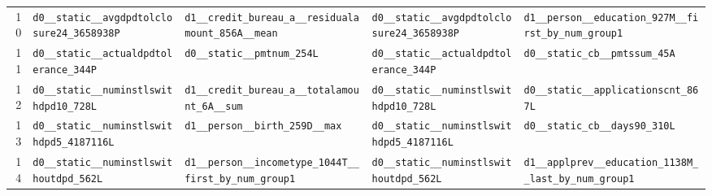 \documentclass[final,5p,twocolumn]{elsarticle}
\begin{document}
\begin{table}[htbp]
\begin{threeparttable}
\begin{tabular}{@{}rL{40mm}L{40mm}L{40mm}L{40mm}@{}}
10 & \texttt{d0\_\allowbreak \_\allowbreak static\_\allowbreak \_\allowbreak avgdpdtolclosure24\_\allowbreak 3658938P} & \texttt{d1\_\allowbreak \_\allowbreak credit\_\allowbreak bureau\_\allowbreak a\_\allowbreak \_\allowbreak residualamount\_\allowbreak 856A\_\allowbreak \_\allowbreak mean} & \texttt{d0\_\allowbreak \_\allowbreak static\_\allowbreak \_\allowbreak avgdpdtolclosure24\_\allowbreak 3658938P} & \texttt{d1\_\allowbreak \_\allowbreak person\_\allowbreak \_\allowbreak education\_\allowbreak 927M\_\allowbreak \_\allowbreak first\_\allowbreak by\_\allowbreak num\_\allowbreak group1} \\
11 & \texttt{d0\_\allowbreak \_\allowbreak static\_\allowbreak \_\allowbreak actualdpdtolerance\_\allowbreak 344P} & \texttt{d0\_\allowbreak \_\allowbreak static\_\allowbreak \_\allowbreak pmtnum\_\allowbreak 254L} & \texttt{d0\_\allowbreak \_\allowbreak static\_\allowbreak \_\allowbreak actualdpdtolerance\_\allowbreak 344P} & \texttt{d0\_\allowbreak \_\allowbreak static\_\allowbreak cb\_\allowbreak \_\allowbreak pmtssum\_\allowbreak 45A} \\
12 & \texttt{d0\_\allowbreak \_\allowbreak static\_\allowbreak \_\allowbreak numinstlswithdpd10\_\allowbreak 728L} & \texttt{d1\_\allowbreak \_\allowbreak credit\_\allowbreak bureau\_\allowbreak a\_\allowbreak \_\allowbreak totalamount\_\allowbreak 6A\_\allowbreak \_\allowbreak sum} & \texttt{d0\_\allowbreak \_\allowbreak static\_\allowbreak \_\allowbreak numinstlswithdpd10\_\allowbreak 728L} & \texttt{d0\_\allowbreak \_\allowbreak static\_\allowbreak \_\allowbreak applicationscnt\_\allowbreak 867L} \\
13 & \texttt{d0\_\allowbreak \_\allowbreak static\_\allowbreak \_\allowbreak numinstlswithdpd5\_\allowbreak 4187116L} & \texttt{d1\_\allowbreak \_\allowbreak person\_\allowbreak \_\allowbreak birth\_\allowbreak 259D\_\allowbreak \_\allowbreak max} & \texttt{d0\_\allowbreak \_\allowbreak static\_\allowbreak \_\allowbreak numinstlswithdpd5\_\allowbreak 4187116L} & \texttt{d0\_\allowbreak \_\allowbreak static\_\allowbreak cb\_\allowbreak \_\allowbreak days90\_\allowbreak 310L} \\
14 & \texttt{d0\_\allowbreak \_\allowbreak static\_\allowbreak \_\allowbreak numinstlswithoutdpd\_\allowbreak 562L} & \texttt{d1\_\allowbreak \_\allowbreak person\_\allowbreak \_\allowbreak incometype\_\allowbreak 1044T\_\allowbreak \_\allowbreak first\_\allowbreak by\_\allowbreak num\_\allowbreak group1} & \texttt{d0\_\allowbreak \_\allowbreak static\_\allowbreak \_\allowbreak numinstlswithoutdpd\_\allowbreak 562L} & \texttt{d1\_\allowbreak \_\allowbreak applprev\_\allowbreak \_\allowbreak education\_\allowbreak 1138M\_\allowbreak \_\allowbreak last\_\allowbreak by\_\allowbreak num\_\allowbreak group1} \\

\end{tabular}
\end{threeparttable}
\end{table}
\end{document}
